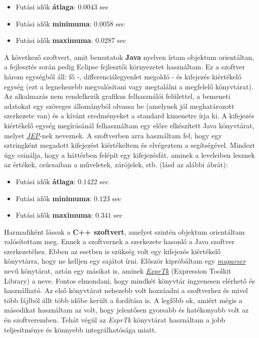 \begin{itemize}
	\item Futási idők \textbf{átlaga}: $ 0.0043 $ sec
	\item Futási idők \textbf{minimuma}: $ 0.0058 $ sec
	\item Futási idők \textbf{maximuma}: $ 0.0287 $ sec
\end{itemize}

A következő szoftvert, amit bemutatok \textbf{Java} nyelven írtam objektum orientáltan, a fejlesztés során pedig Eclipse fejlesztői környezetet használtam. Ez a szoftver három egységből áll: fő -, differenciálegyenlet megoldó - és kifejezés kiértékelő egység (ezt a legnehezebb megvalósítani vagy megtalálni a megfelelő könyvtárat). Az alkalmazás nem rendelkezik grafikus felhasználói felülettel, a bemeneti adatokat egy szöveges állományból olvassa be (amelynek jól meghatározott szerkezete van) és a kívánt eredményeket a standard kimenetre írja ki. A kifejezés kiértékelő egység megírásánál felhasználtam egy előre elkészített Java könyvtárat, melyet \href{http://www.singularsys.com/jep/}{\textit{JEP}}-nek neveznek. A szoftverben arra használtam fel, hogy egy sztringként megadott kifejezést kiértékeltem és elvégeztem a segítségével. Mindezt úgy csinálja, hogy a háttérben felépít egy kifejezésfát, aminek a leveleiben lesznek az értékek, csúcsaiban a műveletek, zárójelek, stb. (lásd az alábbi ábrát):



\begin{itemize}
	\item Futási idők \textbf{átlaga}: $ 0.1422 $ sec
	\item Futási idők \textbf{minimuma}: $ 0.123 $ sec
	\item Futási idők \textbf{maximuma}: $ 0.341 $ sec
\end{itemize}

Harmadiként lássuk a \textbf{C++ szoftvert}, amelyet szintén objektum orientáltam valósítottam meg. Ennek a szoftvernek a szerkezete hasonló a Java szoftver szerkezetéhez. Ebben az esetben is szükség volt egy kifejezés kiértékelő könyvtárra, hogy ne kelljen egy sajátot írni. Először kipróbáltam egy \href{http://beltoforion.de/article.php?a=muparser}{\textit{muparser}} nevű könytárat, aztán egy másikat is, aminek \href{https://exprtk.codeplex.com/}{\textit{ExprTk}} (Expression Toolkit Library) a neve. Fontos elmondani, hogy mindkét könyvtár ingyenesen elérhető és használható. Az első könyvtárat nehezebb volt hozzáadni a szoftverhez és mivel több fájlból állt több időbe került a fordítása is. A legfőbb ok, amiért mégis a másodikat használtam az volt, hogy jelentősen gyorsabb és hatékonyabb volt az én szoftveremben. Tehát végül az \textit{ExprTk} könyvtárat használtam a jobb teljesítménye és könnyebb integrálhatósága miatt.


